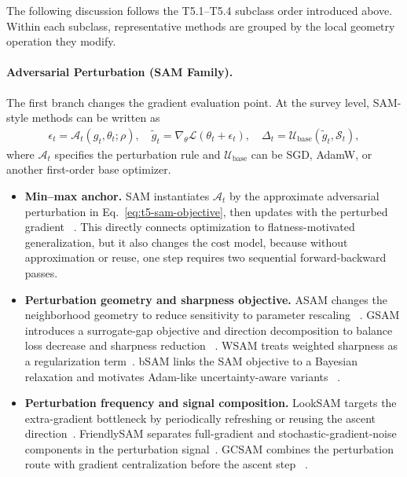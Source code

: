 \noindent
The following discussion follows the T5.1--T5.4 subclass order introduced
above.  Within each subclass, representative methods are grouped by the local
geometry operation they modify.

\paragraph{Adversarial Perturbation (SAM Family).}
\label{sec:t5-adversarial-perturbation}

The first branch changes the gradient evaluation point.  At the survey level,
SAM-style methods can be written as
\begin{equation}
\begin{aligned}
  \epsilon_t=\mathcal{A}_t(g_t,\theta_t;\rho), \quad
  \tilde{g}_t=\nabla_{\theta}\mathcal{L}(\theta_t+\epsilon_t), \quad
  \Delta_t=\mathcal{U}_{\mathrm{base}}(\tilde{g}_t,\mathcal{S}_t),
\end{aligned}
\label{eq:t5-adversarial-template}
\end{equation}
where $\mathcal{A}_t$ specifies the perturbation rule and
$\mathcal{U}_{\mathrm{base}}$ can be SGD, AdamW, or another first-order base
optimizer.
\begin{itemize}
  \setlength{\itemsep}{2pt}
  \item \textbf{Min--max anchor.}  SAM instantiates
  $\mathcal{A}_t$ by the approximate adversarial perturbation in
  Eq.~\eqref{eq:t5-sam-objective}, then updates with the perturbed gradient
  ~\citep{foret2021sharpness}.  This directly connects optimization to
  flatness-motivated generalization, but it also changes the cost model, because
  without approximation or reuse, one step requires two sequential
  forward-backward passes.
  \item \textbf{Perturbation geometry and sharpness objective.}  ASAM changes
  the neighborhood geometry to reduce sensitivity to parameter rescaling
  ~\citep{kwon2021asam}.  GSAM introduces a surrogate-gap objective and
  direction decomposition to balance loss decrease and sharpness reduction
  ~\citep{zhuang2022surrogate}.  WSAM treats weighted sharpness as a regularization
  term~\citep{yue2023sharpness}.  bSAM links the SAM objective to a Bayesian
  relaxation and motivates Adam-like uncertainty-aware variants
  ~\citep{mollenhoff2022sam}.
  \item \textbf{Perturbation frequency and signal composition.}  LookSAM
  targets the extra-gradient bottleneck by periodically refreshing or reusing
  the ascent direction~\citep{liu2022towards}.  FriendlySAM separates
  full-gradient and stochastic-gradient-noise components in the perturbation
  signal~\citep{li2024friendly}.  GCSAM combines the perturbation route
  with gradient centralization before the ascent step
  ~\citep{hassan2025gcsam}.
\end{itemize}

